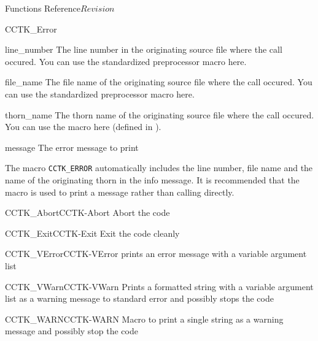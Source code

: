\begin{cactuspart}{ Functions Reference}{}{$Revision$}
\begin{FunctionDescription}{CCTK\_Error}
\begin{ParameterSection}
\begin{Parameter}{line\_number}
The line number in the originating source file where the  call
occured. You can use the standardized  preprocessor macro here.
\end{Parameter}
\begin{Parameter}{file\_name}
The file name of the originating source file where the  call
occured. You can use the standardized  preprocessor macro here.
\end{Parameter}
\begin{Parameter}{thorn\_name}
The thorn name of the originating source file where the  call occured. You can use the  macro here (defined in ).
\end{Parameter}
\begin{Parameter}{message}
The error message to print
\end{Parameter}
\end{ParameterSection}

\begin{Discussion}
The macro \verb|CCTK_ERROR| automatically includes the line number, file name
and the name of the originating thorn in the
info message. It is recommended that the macro  is used
to print a message rather than calling  directly.
\end{Discussion}

\begin{SeeAlsoSection}
\begin{SeeAlso2}{CCTK\_Abort}{CCTK-Abort}
Abort the code
\end{SeeAlso2}
\begin{SeeAlso2}{CCTK\_Exit}{CCTK-Exit}
Exit the code cleanly
\end{SeeAlso2}
\begin{SeeAlso2}{CCTK\_VError}{CCTK-VError}
prints an error message with a variable argument list
\end{SeeAlso2}
\begin{SeeAlso2}{CCTK\_VWarn}{CCTK-VWarn}
Prints a formatted string with a variable argument list as a warning
message to standard error and possibly stops the code
\end{SeeAlso2}
\begin{SeeAlso2}{CCTK\_WARN}{CCTK-WARN}
Macro to print a single string as a warning message and possibly stop the code
\end{SeeAlso2}
\end{SeeAlsoSection}
\end{FunctionDescription}


\end{cactuspart}
